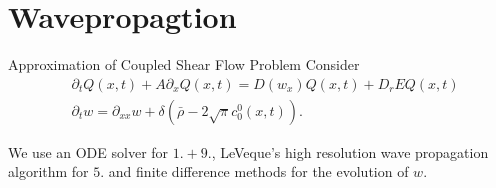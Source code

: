 \section{Wavepropagtion}

\begin{frame}{Approximation of Coupled Shear Flow Problem}
	\scriptsize
	Consider
	\begin{equation}
		\begin{split}
			&\partial_t Q(x,t) + A\partial_x Q(x,t) =  D(w_x)Q(x,t)+ D_rEQ(x,t) \\
			&\partial_{t}w = \partial_{xx}w + \delta(\bar{\rho}-2\sqrt{\pi} c^0_0(x,t)).
		\end{split}
		\label{coupledsys_1d}
	\end{equation}
	\begin{table}[h]
		\centering
		\renewcommand{\arraystretch}{1.3}
		\caption{Splitting algorithm for solving the coupled shear flow problem (Dahm et al.)}
	\end{table}
	We use an ODE solver for $1.+9.$, LeVeque’s high resolution wave propagation algorithm for $5.$ and finite difference methods for the evolution of $w$.
\end{frame}

